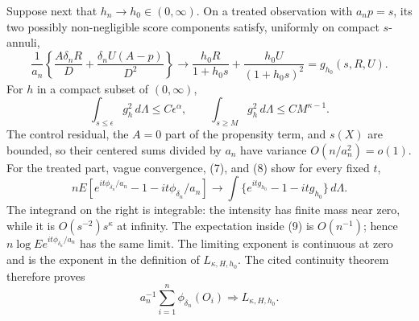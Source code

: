 Suppose next that \(h_n\to h_0\in(0,\infty)\).  On a treated observation with \(a_np=s\), its two possibly non-negligible score components satisfy, uniformly on compact \(s\)-annuli,
\[
 \frac1{a_n}\left\{\frac{A\delta_nR}{D}+\frac{\delta_nU(A-p)}{D^2}\right\}
 \longrightarrow \frac{h_0R}{1+h_0s}+\frac{h_0U}{(1+h_0s)^2}=g_{h_0}(s,R,U). \tag{7}
\]
For \(h\) in a compact subset of \((0,\infty)\),
\[
 \int_{s\leq\epsilon}g_h^2\,d\Lambda\leq C\epsilon^\alpha,
 \qquad
 \int_{s\geq M}g_h^2\,d\Lambda\leq C M^{\kappa-1}. \tag{8}
\]
The control residual, the \(A=0\) part of the propensity term, and \(s(X)\) are bounded, so their centered sums divided by \(a_n\) have variance \(O(n/a_n^2)=o(1)\).  For the treated part, vague convergence, (7), and (8) show for every fixed \(t\),
\[
 nE\!\left[
 e^{it\phi_{\delta_n}/a_n}-1-it\phi_{\delta_n}/a_n
 \right]
 \longrightarrow
 \int\{e^{it g_{h_0}}-1-itg_{h_0}\}\,d\Lambda. \tag{9}
\]
The integrand on the right is integrable: the intensity has finite mass near zero, while it is \(O(s^{-2})s^\kappa\) at infinity.  The expectation inside (9) is \(O(n^{-1})\); hence \(n\log E e^{it\phi_{\delta_n}/a_n}\) has the same limit.  The limiting exponent is continuous at zero and is the exponent in the definition of \(L_{\kappa,H,h_0}\).  The cited continuity theorem therefore proves
\[
 a_n^{-1}\sum_{i=1}^n\phi_{\delta_n}(O_i)\Rightarrow L_{\kappa,H,h_0}. \tag{10}
\]

